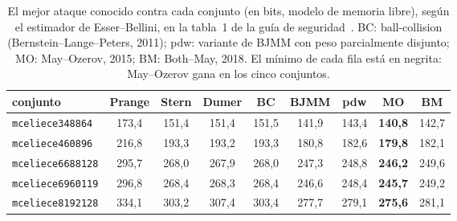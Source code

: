 \documentclass[11pt,a4paper,oneside]{report}
\begin{document}
\begin{table}[htbp]
\centering
\footnotesize
\setlength{\tabcolsep}{4pt}
\begin{tabular}{lcccccccc}
\toprule
conjunto & Prange & Stern & Dumer & BC & BJMM & pdw & MO & BM\\
\midrule
\texttt{mceliece348864} & 173{,}4 & 151{,}4 & 151{,}4 & 151{,}5 & 141{,}9 & 143{,}4 & \textbf{140{,}8} & 142{,}7\\
\texttt{mceliece460896} & 216{,}8 & 193{,}3 & 193{,}2 & 193{,}3 & 180{,}8 & 182{,}6 & \textbf{179{,}8} & 182{,}1\\
\texttt{mceliece6688128} & 295{,}7 & 268{,}0 & 267{,}9 & 268{,}0 & 247{,}3 & 248{,}8 & \textbf{246{,}2} & 249{,}6\\
\texttt{mceliece6960119} & 296{,}8 & 268{,}4 & 268{,}3 & 268{,}4 & 246{,}6 & 248{,}4 & \textbf{245{,}7} & 249{,}2\\
\texttt{mceliece8192128} & 334{,}1 & 303{,}2 & 307{,}4 & 303{,}4 & 277{,}7 & 279{,}1 & \textbf{275{,}6} & 281{,}1\\
\bottomrule
\end{tabular}
\caption{El mejor ataque conocido contra cada conjunto (en bits, modelo
de memoria libre), según el estimador de Esser--Bellini, en la
tabla~1 de la guía de seguridad~\cite{cmsecurity}. BC: ball-collision
(Bernstein--Lange--Peters, 2011); pdw: variante de BJMM con peso
parcialmente disjunto; MO: May--Ozerov, 2015; BM: Both--May, 2018. El
mínimo de cada fila está en negrita: May--Ozerov gana en los cinco
conjuntos.}
\label{tab:isd-guia}
\end{table}
\end{document}
